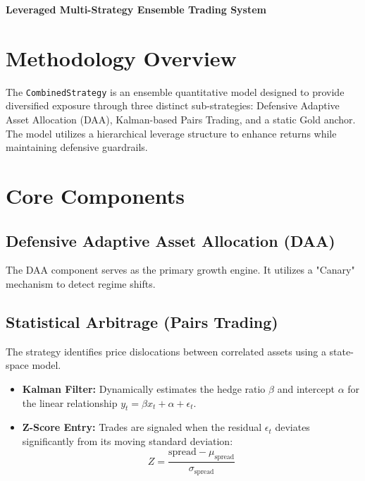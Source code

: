 \documentclass[11pt]{article}
\begin{document}
\begin{center}
{\Large \textbf{Leveraged Multi-Strategy Ensemble Trading System}}\\[0.5em]
\end{center}

\section{Methodology Overview}
The \texttt{CombinedStrategy} is an ensemble quantitative model designed to provide diversified exposure through three distinct sub-strategies: Defensive Adaptive Asset Allocation (DAA), Kalman-based Pairs Trading, and a static Gold anchor. The model utilizes a hierarchical leverage structure to enhance returns while maintaining defensive guardrails.

\section{Core Components}

\subsection{Defensive Adaptive Asset Allocation (DAA)}
The DAA component serves as the primary growth engine. It utilizes a "Canary" mechanism to detect regime shifts.

\subsection{Statistical Arbitrage (Pairs Trading)}
The strategy identifies price dislocations between correlated assets using a state-space model.
\begin{itemize}
    \item \textbf{Kalman Filter:} Dynamically estimates the hedge ratio $\beta$ and intercept $\alpha$ for the linear relationship $y_t = \beta x_t + \alpha + \epsilon_t$.
    \item \textbf{Z-Score Entry:} Trades are signaled when the residual $\epsilon_t$ deviates significantly from its moving standard deviation:
    \begin{equation}
    Z = \frac{\text{spread} - \mu_{\text{spread}}}{\sigma_{\text{spread}}}
    \end{equation}
\end{itemize}
\end{document}
